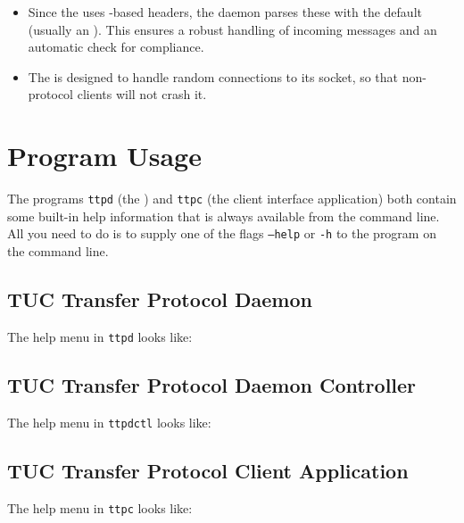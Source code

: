 \documentclass[a4paper,english,11pt,twoside,openright]{book}
\newcommand{\code}[1]{\texttt{#1}}
\begin{document}
\begin{itemize}
\begin{itemize}
  \end{itemize}

\item Since the  
  uses -based headers, the daemon parses these with the
  default   (usually an ).
  This ensures a robust handling of incoming messages and an automatic
  check for  compliance.

\item The  is designed to handle random connections to its
  socket, so that non-protocol clients will not crash it.

\end{itemize}


\chapter{Program Usage}
\label{cha:program-usage}

The programs \code{ttpd} (the ) and \code{ttpc} (the client
interface application) both contain some built-in help information
that is always available from the command line.  All you need to do is
to supply one of the flags \code{--help} or \code{-h} to the program
on the command line.

\section{TUC Transfer Protocol Daemon}
\label{sec:tuc-transf-prot-1}

The help menu in \code{ttpd} looks like:

{\small

}

\section{TUC Transfer Protocol Daemon Controller}
\label{sec:tuc-transf-prot-3}

The help menu in \code{ttpdctl} looks like:

{\small

}

\section{TUC Transfer Protocol Client Application}
\label{sec:tuc-transf-prot-2}

The help menu in \code{ttpc} looks like:
\end{document}
